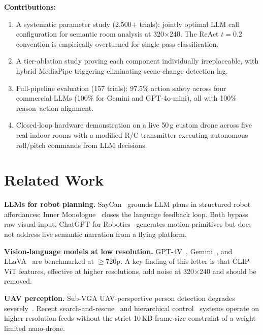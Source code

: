 \documentclass[journal]{IEEEtran}
\begin{document}
\textbf{Contributions:}
\begin{enumerate}
\item A systematic parameter study (2,500$+$ trials): jointly
  optimal LLM call configuration for semantic room analysis at
  320$\times$240. The ReAct $t=0.2$ convention is empirically
  overturned for single-pass classification.
\item A tier-ablation study proving each component individually
  irreplaceable, with hybrid MediaPipe triggering eliminating
  scene-change detection lag.
\item Full-pipeline evaluation (157 trials): 97.5\% action safety
  across four commercial LLMs (100\% for Gemini and GPT-4o-mini),
  all with 100\% reason--action alignment.
\item Closed-loop hardware demonstration on a live 50\,g custom
  drone across five real indoor rooms with a modified R/C
  transmitter executing autonomous roll/pitch commands from LLM
  decisions.
\end{enumerate}

\section{Related Work}
\label{sec:related}

\textbf{LLMs for robot planning.}
SayCan~\cite{ahn2022saycan} grounds LLM plans in structured robot
affordances; Inner Monologue~\cite{huang2022innermonologue} closes
the language feedback loop.
Both bypass raw visual input.
ChatGPT for Robotics~\cite{vemprala2023chatgpt} generates motion
primitives but does not address live semantic narration from a
flying platform.

\textbf{Vision-language models at low resolution.}
GPT-4V~\cite{achiam2023gpt4}, Gemini~\cite{reid2024gemini}, and
LLaVA~\cite{liu2023llava} are benchmarked at $\geq$720p.
A key finding of this letter is that CLIP-ViT features, effective
at higher resolutions, add noise at 320$\times$240 and should be
removed.

\textbf{UAV perception.}
Sub-VGA UAV-perspective person detection degrades
severely~\cite{persondetectionuav2025,kim2024yoloihd}.
Recent search-and-rescue~\cite{rescuedrone2025} and hierarchical
control~\cite{hierarchicaldrone2025} systems operate on
higher-resolution feeds without the strict 10\,KB frame-size
constraint of a weight-limited nano-drone.
\end{document}
